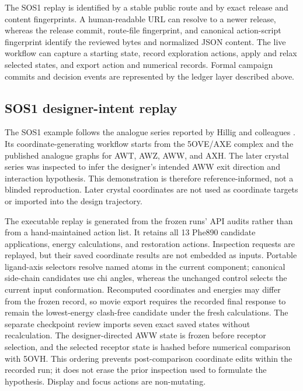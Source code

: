 \documentclass[11pt]{article}
\begin{document}
\begin{small}
The SOS1 replay is identified by a stable public route and by exact release and content fingerprints. A human-readable URL can resolve to a newer release, whereas the release commit, route-file fingerprint, and canonical action-script fingerprint identify the reviewed bytes and normalized JSON content. The live workflow can capture a starting state, record exploration actions, apply and relax selected states, and export action and numerical records. Formal campaign commits and decision events are represented by the ledger layer described above.

\subsection{SOS1 designer-intent replay}

The SOS1 example follows the analogue series reported by Hillig and colleagues \citep{hillig2019sos1}. Its coordinate-generating workflow starts from the 5OVE/AXE complex and the published analogue graphs for AWT, AWZ, AWW, and AXH. The later crystal series was inspected to infer the designer's intended AWW exit direction and interaction hypothesis. This demonstration is therefore reference-informed, not a blinded reproduction. Later crystal coordinates are not used as coordinate targets or imported into the design trajectory.

The executable replay is generated from the frozen runs' API audits rather than from a hand-maintained action list. It retains all 13 Phe890 candidate applications, energy calculations, and restoration actions. Inspection requests are replayed, but their saved coordinate results are not embedded as inputs. Portable ligand-axis selectors resolve named atoms in the current component; canonical side-chain candidates use chi angles, whereas the unchanged control selects the current input conformation. Recomputed coordinates and energies may differ from the frozen record, so movie export requires the recorded final response to remain the lowest-energy clash-free candidate under the fresh calculations. The separate checkpoint review imports seven exact saved states without recalculation. The designer-directed AWW state is frozen before receptor selection, and the selected receptor state is hashed before numerical comparison with 5OVH. This ordering prevents post-comparison coordinate edits within the recorded run; it does not erase the prior inspection used to formulate the hypothesis. Display and focus actions are non-mutating.


\end{small}
\end{document}
